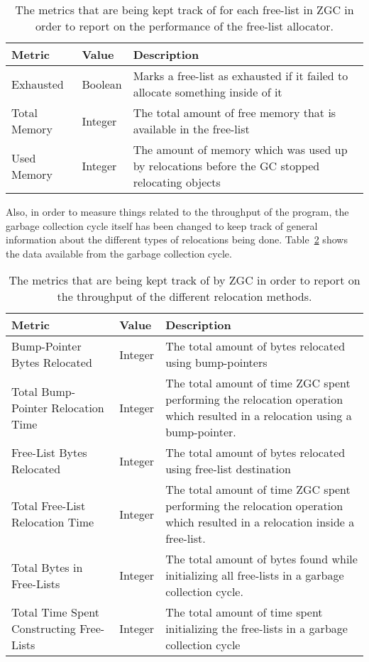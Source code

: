 \begin{table}[H]
  \centering
  \begin{tabular}{|l|l|p{8cm}|}
    \hline
    Metric & Value & Description \\ \hline
    Exhausted & Boolean & Marks a free-list as exhausted if it failed to allocate something inside of it \\ \hline
    Total Memory & Integer & The total amount of free memory that is available in the free-list \\ \hline
    Used Memory & Integer & The amount of memory which was used up by relocations before the GC stopped relocating objects \\ \hline
  \end{tabular}
  \caption{The metrics that are being kept track of for each free-list in ZGC in order to report on the performance of the free-list allocator.}
  \label{table:gc_logs_fl}
\end{table}

Also, in order to measure things related to the throughput of the program, the garbage collection cycle itself has been changed to keep track of general information about the different types of relocations being done. Table~\ref{table:gc_logs_throughput} shows the data available from the garbage collection cycle.

\begin{table}[H]
  \centering
  \begin{tabular}{|p{4cm}|l|p{6cm}|}
    \hline
    Metric & Value & Description \\ \hline
    Bump-Pointer Bytes Relocated & Integer & The total amount of bytes relocated using bump-pointers \\ \hline
    Total Bump-Pointer Relocation Time & Integer & The total amount of time ZGC spent performing the relocation operation which resulted in a relocation using a bump-pointer. \\ \hline
    Free-List Bytes Relocated & Integer & The total amount of bytes relocated using free-list destination \\ \hline
    Total Free-List Relocation Time & Integer & The total amount of time ZGC spent performing the relocation operation which resulted in a relocation inside a free-list. \\ \hline
    Total Bytes in Free-Lists & Integer & The total amount of bytes found while initializing all free-lists in a garbage collection cycle. \\ \hline
    Total Time Spent Constructing Free-Lists &  Integer & The total amount of time spent initializing the free-lists in a garbage collection cycle \\ \hline
  \end{tabular}
  \caption{The metrics that are being kept track of by ZGC in order to report on the throughput of the different relocation methods.}
  \label{table:gc_logs_throughput}
\end{table}

